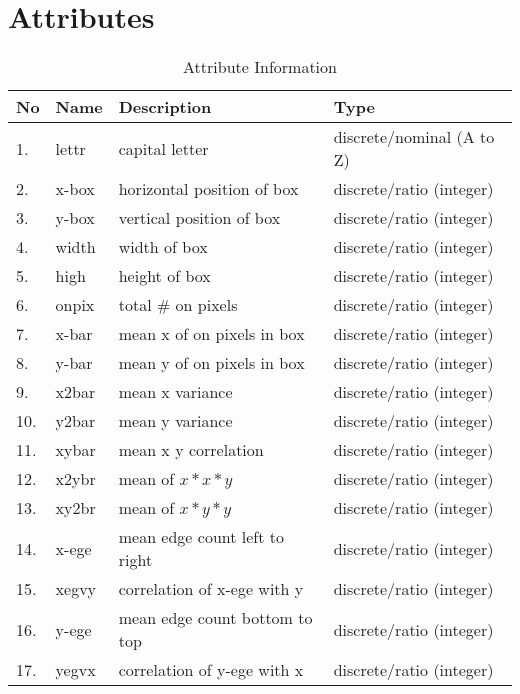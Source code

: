 \chapter*{Attributes}


\begin{table}[ht!]
    \centering
    \begin{tabular}{|l|l|l|l|}
         \hline
             No & Name & Description & Type \\ \hline
             1. & lettr & capital letter             & discrete/nominal (A to Z)  \\ \hline
             2. & x-box & horizontal position of box & discrete/ratio (integer)   \\ \hline
             3. & y-box & vertical position of box   & discrete/ratio (integer)   \\ \hline
             4. & width & width of box               & discrete/ratio (integer)   \\ \hline
             5. & high  & height of box              & discrete/ratio (integer)   \\ \hline
             6. & onpix & total \# on pixels         & discrete/ratio (integer)   \\ \hline
             7. & x-bar & mean x of on pixels in box & discrete/ratio (integer)   \\ \hline
             8. & y-bar & mean y of on pixels in box & discrete/ratio (integer)   \\ \hline
             9. & x2bar & mean x variance            & discrete/ratio (integer)   \\ \hline
            10. & y2bar & mean y variance            & discrete/ratio (integer)   \\ \hline
            11. & xybar & mean x y correlation       & discrete/ratio (integer)   \\ \hline
            12. & x2ybr & mean of $x * x * y$        & discrete/ratio (integer)   \\ \hline
            13. & xy2br & mean of $x * y * y$        & discrete/ratio (integer)   \\ \hline
            14. & x-ege & mean edge count left to right  & discrete/ratio (integer) \\ \hline
            15. & xegvy & correlation of x-ege with y    & discrete/ratio (integer) \\ \hline
            16. & y-ege & mean edge count bottom to top  & discrete/ratio (integer) \\ \hline
            17. & yegvx & correlation of y-ege with x    & discrete/ratio (integer) \\ \hline
    \end{tabular}
    \caption{Attribute Information}
\end{table}


